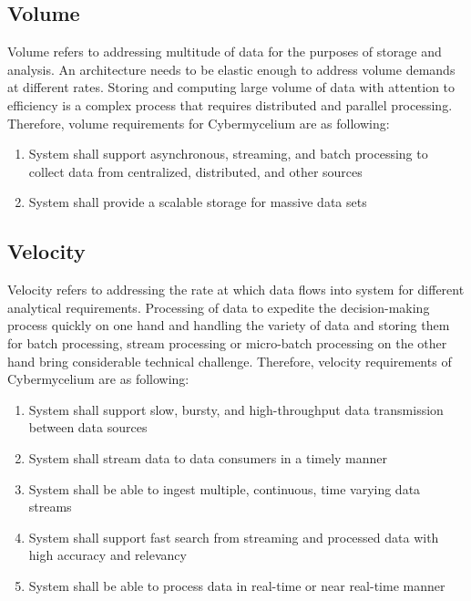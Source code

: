 \documentclass[review]{elsarticle}
\begin{document}

\subsection{Volume}

Volume refers to addressing multitude of data for the purposes of storage and analysis. An architecture needs to be elastic enough to address volume demands at different rates. Storing and computing large volume of data with attention to efficiency is a complex process that requires distributed and parallel processing. Therefore, volume requirements for Cybermycelium are as following:


\begin{enumerate}[label=\textbf{Vol-\arabic*}]
    \item System shall support asynchronous, streaming, and batch processing to collect data from centralized, distributed, and other sources
    \item System shall provide a scalable storage for massive data sets
\end{enumerate}


\subsection{Velocity}

Velocity refers to addressing the rate at which data flows into system for different analytical requirements. Processing of data to expedite the decision-making process quickly on one hand and handling the variety of data and storing them for batch processing, stream processing or micro-batch processing on the other hand bring considerable technical challenge. Therefore, velocity requirements of Cybermycelium are as following: 

\begin{enumerate}[label=\textbf{Vel-\arabic*}]
    \item System shall support slow, bursty, and high-throughput data transmission between data sources
    \item System shall stream data to data consumers in a timely manner
    \item System shall be able to ingest multiple, continuous, time varying data streams
    \item System shall support fast search from streaming and processed data with high accuracy and relevancy
    \item System shall be able to process data in real-time or near real-time manner
\end{enumerate}
\end{document}
